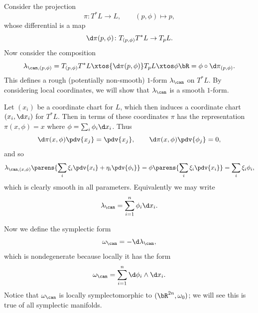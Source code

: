     Consider the projection
    $$ \pi\colon T^*L \to L,\qquad (p,\phi)\mapsto p , $$
    whose differential is a map
    $$ \d\pi(p,\phi)\colon T_{(p,\phi)}T^*L \to T_pL . $$
    Now consider the composition
    $$ \lambda_{\can,(p,\phi)} = T_{(p,\phi)}T^*L \xtos{\d\pi(p,\phi)} T_pL \xtos\phi \bR = \phi\circ\d\pi_{(p,\phi)} . $$
    This defines a rough (potentially non-smooth) $1$-form $\lambda_\can$ on $T^*L$.
    By considering local coordinates, we will show that $\lambda_\can$ is a smooth $1$-form.

    Let $(x_i)$ be a coordinate chart for $L$, which then induces a coordinate chart $(x_i,\d x_i)$ for $T^*L$.
    Then in terms of these coordinates $\pi$ has the representation $\pi(x,\phi)=x$ where $\phi=\sum_i\phi_i\d x_i$.
    Thus
    $$ \d\pi(x,\phi)\pdv{x_j} = \pdv{x_j},\qquad \d\pi(x,\phi)\pdv{\phi_j} = 0 , $$
    and so
    $$ \lambda_{\can,(x,\phi)}\parens{\sum_i\xi_i\pdv{x_i} + \eta_i\pdv{\phi_i}} = \phi\parens{\sum_i\xi_i\pdv{x_i}} = \sum_i\xi_i\phi_i , $$
    which is clearly smooth in all parameters.
    Equivalently we may write
    $$ \lambda_\can = \sum_{i=1}^n\phi_i\d x_i . $$

    Now we define the symplectic form
    $$ \omega_\can = -\d\lambda_\can , $$
    which is nondegenerate because locally it has the form
    $$ \omega_\can = \sum_{i=1}^n\d\phi_i\wedge\d x_i . $$
    Notice that $\omega_\can$ is locally symplectomorphic to $(\bR^{2n},\omega_0)$; we will see this is true of all symplectic manifolds.

\eremark

